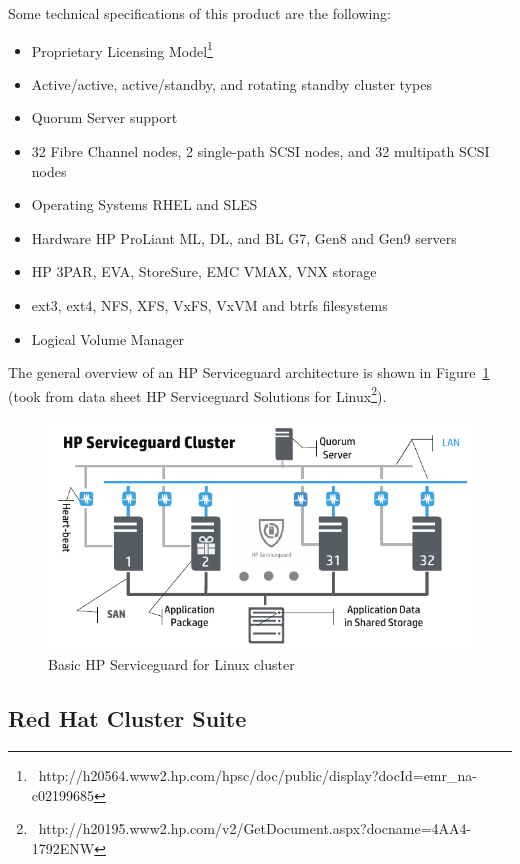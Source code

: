 \documentclass[a4paper, 12pt]{book}
\begin{document}
\noindent Some technical specifications of this product are the following:

\begin{itemize}
	\item Proprietary Licensing Model\footnote{{\tiny\ http://h20564.www2.hp.com/hpsc/doc/public/display?docId=emr\_na-c02199685}}
	\item Active/active, active/standby, and rotating standby cluster types
	\item Quorum Server support
	\item 32 Fibre Channel nodes, 2 single-path SCSI nodes, and 32 multipath SCSI nodes
	\item Operating Systems RHEL and SLES
	\item Hardware HP ProLiant ML, DL, and BL G7, Gen8 and Gen9 servers
	\item HP 3PAR, EVA, StoreSure, EMC VMAX, VNX storage
	\item ext3, ext4, NFS, XFS, VxFS, VxVM and btrfs filesystems
	\item Logical Volume Manager
\end{itemize}

\noindent The general overview of an HP Serviceguard architecture is shown in Figure~\ref{fig:serviceguard} (took from data sheet HP Serviceguard Solutions for Linux\footnote{{\tiny\ http://h20195.www2.hp.com/v2/GetDocument.aspx?docname=4AA4-1792ENW}}).

\begin{figure}
  \centering
  \includegraphics[scale=0.70]{hp-serviceguard.png}
  \caption[Basic HP Serviceguard for Linux cluster]{Basic HP Serviceguard for Linux cluster}
  \label{fig:serviceguard}
\end{figure}


\subsection{Red Hat Cluster Suite}
\label{subsec:rhcs}
\end{document}
